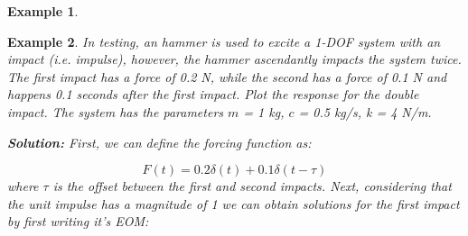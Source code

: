 \documentclass[12pt,letter]{article}
\newtheorem{ex}{Example}
\numberwithin{ex}{section} %
\newenvironment{example}{\begin{mdframed}[middlelinewidth=0.5mm]\begin{ex}\normalfont}{\end{ex}\end{mdframed}}
\numberwithin{re}{section} %
\begin{document}
\begin{example}

\end{example}
\begin{example}


In testing, an hammer is used to excite a 1-DOF system with an impact (i.e. impulse), however, the hammer ascendantly impacts the system twice. The first impact has a force of 0.2 N, while the second has a force of 0.1 N and happens 0.1 seconds after the first impact. Plot the response for the double impact. The system has the parameters $m$ = 1 kg, $c$ = 0.5 kg/s, k = 4 N/m. 

\noindent\textbf{Solution:} First, we can define the forcing function as:

\begin{equation}
	F(t) = 0.2 \delta (t) + 0.1 \delta(t-\tau)
\end{equation}
where $\tau$ is the offset between the first and second impacts. Next, considering that the unit impulse has a magnitude of 1 we can obtain solutions for the first impact by first writing it's EOM:


\end{example}
\end{document}
